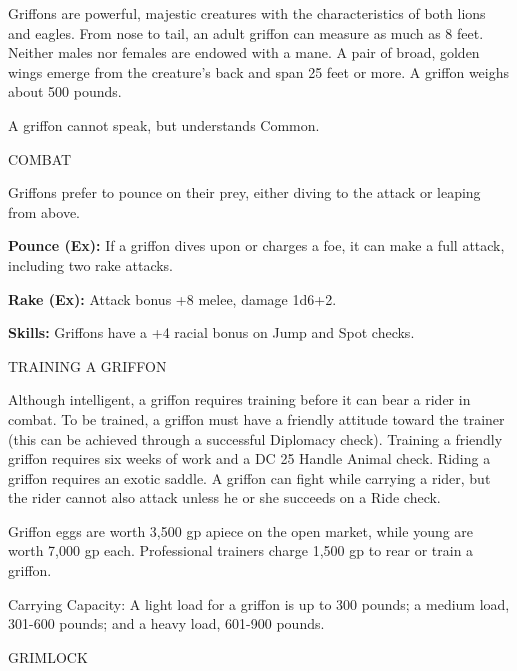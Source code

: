 \documentclass{article}
\begin{document}
Griffons are powerful, majestic creatures with the characteristics of both lions 
and eagles. From nose to tail, an adult griffon can measure as much as 8 feet. 
Neither males nor females are endowed with a mane. A pair of broad, golden wings 
emerge from the creature's back and span 25 feet or more. A griffon weighs about 
500 pounds.

A griffon cannot speak, but understands Common.

COMBAT

Griffons prefer to pounce on their prey, either diving to the attack or leaping 
from above.

\textbf{Pounce (Ex):} If a griffon dives upon or charges a foe, it can make a full 
attack, including two rake attacks.

\textbf{Rake (Ex): }Attack bonus +8 melee, damage 1d6+2. 

\textbf{Skills: }Griffons have a +4 racial bonus on Jump and Spot checks.

TRAINING A GRIFFON

Although intelligent, a griffon requires training before it can bear a rider in 
combat. To be trained, a griffon must have a friendly attitude toward the trainer 
(this can be achieved through a successful Diplomacy check). Training a friendly 
griffon requires six weeks of work and a DC 25 Handle Animal check. Riding a griffon 
requires an exotic saddle. A griffon can fight while carrying a rider, but the 
rider cannot also attack unless he or she succeeds on a Ride check.

Griffon eggs are worth 3,500 gp apiece on the open market, while young are worth 
7,000 gp each. Professional trainers charge 1,500 gp to rear or train a griffon.

Carrying Capacity: A light load for a griffon is up to 300 pounds; a medium load, 
301-600 pounds; and a heavy load, 601-900 pounds.

\vspace{12pt}
{\LARGE{}GRIMLOCK}
\end{document}
